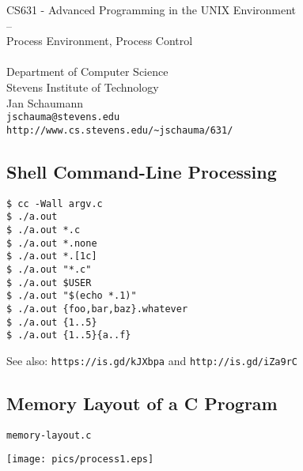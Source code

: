 \documentclass[xga]{xdvislides}
\begin{document}
\setfontphv

\lhead{\slidetitle}
\cfoot{\relax}
\rfoot{\Gray{\today}}

\newcommand{\smallish}{\fontsize{16}{16}\selectfont}

\vspace*{\fill}
\begin{center}
	\Hugesize
		CS631 - Advanced Programming in the UNIX Environment\\
		-- \\
		Process Environment, Process Control \\
	\hspace*{5mm}\blueline\\ [1em]
	\Normalsize
		Department of Computer Science\\
		Stevens Institute of Technology\\
		Jan Schaumann\\
		\verb+jschauma@stevens.edu+\\
		\verb+http://www.cs.stevens.edu/~jschauma/631/+
\end{center}
\vspace*{\fill}

\subsection{Shell Command-Line Processing}
\begin{center}
\Huge
\begin{verbatim}
$ cc -Wall argv.c
$ ./a.out
$ ./a.out *.c
$ ./a.out *.none
$ ./a.out *.[1c]
$ ./a.out "*.c"
$ ./a.out $USER
$ ./a.out "$(echo *.1)"
$ ./a.out {foo,bar,baz}.whatever
$ ./a.out {1..5}
$ ./a.out {1..5}{a..f}
\end{verbatim}
\normalsize
\vspace{.25in}
See also:
\verb+https://is.gd/kJXbpa+ and \verb+http://is.gd/iZa9rC+
\end{center}

\subsection{Memory Layout of a C Program}
{\tt memory-layout.c}
\begin{center}
	\texttt{[image: pics/process1.eps]}
\end{center}
\end{document}
